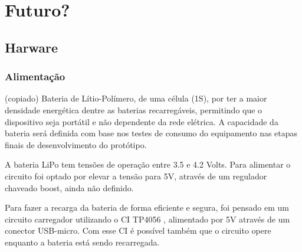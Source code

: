 \documentclass[../monografia.tex]{subfiles}
\begin{document}
\section{Futuro?}
\subsection{Harware}
\subsubsection{Alimentação}
(copiado)
Bateria de Lítio-Polímero, de uma célula (1S), por ter a maior densidade energética dentre as baterias recarregáveis, permitindo que o dispositivo seja portátil e não dependente da rede elétrica. A capacidade da bateria será definida com base nos testes de consumo do equipamento nas etapas finais de desenvolvimento do protótipo. 

A bateria LiPo tem tensões de operação entre 3.5 e 4.2 Volts. Para alimentar o circuito foi optado por elevar a tensão para 5V, através de um regulador chaveado boost, ainda não definido. 

Para fazer a recarga da bateria de forma eficiente e segura, foi pensado em um circuito carregador utilizando o CI TP4056 \cite{tp4056}, alimentado por 5V através de um conector USB-micro. Com esse CI é possível também que o circuito opere enquanto a bateria está sendo recarregada. 
\end{document}

